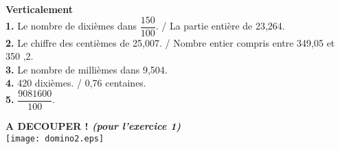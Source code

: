 \documentclass[a4paper,11pt]{article}
\begin{document}
\textbf{Verticalement}\\

\noindent \textbf{1.}      Le nombre de dixièmes dans $\dfrac{150}{100}$. / La partie entière de 23,264.\\
\textbf{2.}      Le chiffre des centièmes de 25,007. / Nombre entier compris 
entre 349,05 et 350 ,2.\\
\textbf{3.}      Le nombre de millièmes dans 9,504.\\
\textbf{4.}      420 dixièmes. /  0,76 centaines.\\
\textbf{5.}      $\dfrac{9081600}{100}$.\\


\vspace*{2.5cm}

\textbf{{\large A DECOUPER !} \textit{(pour l'exercice 1)}} \\

\texttt{[image: domino2.eps]} 
\end{document}
